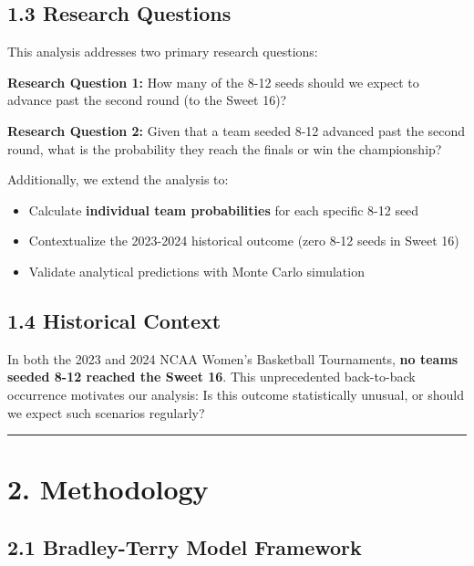 \documentclass[
]{article}
\providecommand{\tightlist}{%
  \setlength{\itemsep}{0pt}\setlength{\parskip}{0pt}}
\begin{document}
\subsection{1.3 Research Questions}\label{research-questions}

This analysis addresses two primary research questions:

\textbf{Research Question 1:} How many of the 8-12 seeds should we
expect to advance past the second round (to the Sweet 16)?

\textbf{Research Question 2:} Given that a team seeded 8-12 advanced
past the second round, what is the probability they reach the finals or
win the championship?

Additionally, we extend the analysis to:

\begin{itemize}
\tightlist
\item
  Calculate \textbf{individual team probabilities} for each specific
  8-12 seed
\item
  Contextualize the 2023-2024 historical outcome (zero 8-12 seeds in
  Sweet 16)
\item
  Validate analytical predictions with Monte Carlo simulation
\end{itemize}

\subsection{1.4 Historical Context}\label{historical-context}

In both the 2023 and 2024 NCAA Women's Basketball Tournaments,
\textbf{no teams seeded 8-12 reached the Sweet 16}. This unprecedented
back-to-back occurrence motivates our analysis: Is this outcome
statistically unusual, or should we expect such scenarios regularly?

\begin{center}\rule{0.5\linewidth}{0.5pt}\end{center}

\section{2. Methodology}\label{methodology}

\subsection{2.1 Bradley-Terry Model
Framework}\label{bradley-terry-model-framework}
\end{document}
